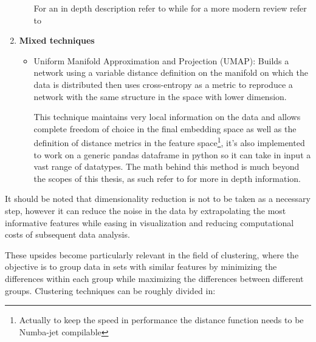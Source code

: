 \begin{enumerate}
\begin{itemize}
 For an in depth description refer to \cite{PLSDA} while for a more modern review refer to \cite{PLSDA_review}
	\end{itemize}

\item \textbf{Mixed techniques}
	\begin{itemize}
		\item Uniform Manifold Approximation and Projection (UMAP): Builds a network using a variable distance definition on the manifold on which the data is distributed then uses cross-entropy as a metric to reproduce a network with the same structure in the space with lower dimension. 

This technique maintains very local information on the data and allows complete freedom of choice in the final embedding space as well as the definition of distance metrics in the feature space\footnote{Actually to keep the speed in performance the distance function needs to be Numba-jet compilable}, it's also implemented to work on a generic pandas dataframe in python so it can take in input a vast range of datatypes. The math behind this method is much beyond the scopes of this thesis, as such refer to \cite{UMAP} for more in depth information.
	\end{itemize}
\end{enumerate}

It should be noted that dimensionality reduction is not to be taken as a necessary step, however it can reduce the noise in the data by extrapolating the most informative features while easing in visualization and reducing computational costs of subsequent data analysis. 

These upsides become particularly relevant in the field of clustering, where the objective is to group data in sets with similar features by minimizing the differences within each group while maximizing the differences between different groups. Clustering techniques can be roughly divided in:

